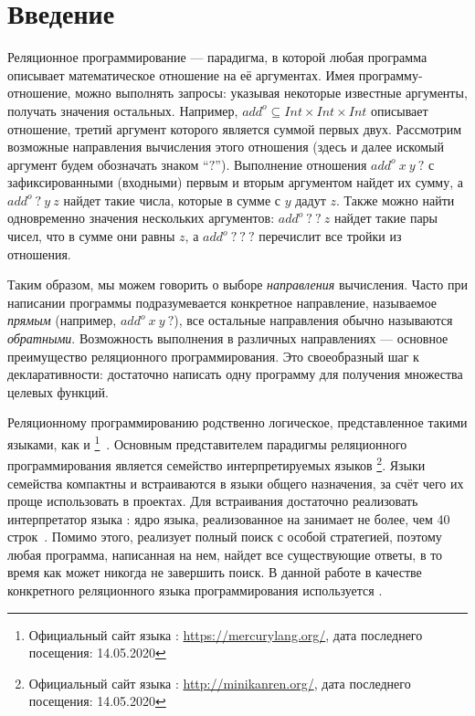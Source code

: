 \section*{Введение}

Реляционное программирование --- парадигма, в которой любая программа описывает математическое отношение на её аргументах. 
Имея программу-отношение, можно выполнять запросы: указывая некоторые известные аргументы, получать значения остальных.
Например, $add^o \subseteq Int \times Int \times Int$ описывает отношение, третий аргумент которого является суммой первых двух. 
Рассмотрим возможные направления вычисления этого отношения (здесь и далее искомый аргумент будем обозначать знаком ``$?$'').
Выполнение отношения $add^o  \ x \ y \ ?$ с зафиксированными (входными) первым и вторым аргументом найдет их сумму, а $add^o \ ? \ y \ z$ найдет такие числа, которые в сумме с $y$ дадут $z$. 
Также можно найти одновременно значения нескольких аргументов: $add^o \ ? \ ? \ z$ найдет такие пары чисел, что в сумме они равны $z$, а $add^o \ ? \ ? \ ?$ перечислит все тройки из отношения. 

Таким образом, мы можем говорить о выборе \textit{направления} вычисления. 
Часто при написании программы подразумевается конкретное направление, называемое \textit{прямым} (например, $add^o  \ x \ y \ ?$), все остальные направления обычно называются \textit{обратными}. 
Возможность выполнения в различных направлениях --- основное преимущество реляционного программирования. 
Это своеобразный шаг к декларативности: достаточно написать одну программу для получения множества целевых функций. 

Реляционному программированию родственно логическое, представленное такими языками, как \prolog{} и \mercury{}\footnote{Официальный сайт языка \mercury{}: \url{https://mercurylang.org/}, дата последнего посещения: 14.05.2020}~\cite{SOMOGYI199617}.
Основным представителем парадигмы реляционного программирования является семейство интерпретируемых языков \miniKanren{}\footnote{Официальный сайт языка \miniKanren{}: \url{http://minikanren.org/}, дата последнего посещения: 14.05.2020}.
Языки семейства \miniKanren{} компактны и встраиваются в языки общего назначения, за счёт чего их проще использовать в  проектах. 
Для встраивания достаточно реализовать интерпретатор языка \miniKanren{}: ядро языка, реализованное на \scheme{} занимает не более, чем 40 строк~\cite{hemann2013ukanren}.
Помимо этого, \miniKanren{} реализует полный поиск с особой стратегией, поэтому любая программа, написанная на нем, найдет все существующие ответы, в то время как \prolog{} может никогда не завершить поиск. 
В данной работе в качестве конкретного реляционного языка программирования используется \miniKanren{}.

